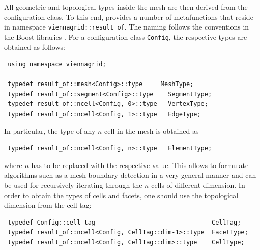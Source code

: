 All geometric and topological types inside the mesh are then derived from the configuration class. To this end, {\ViennaGrid} provides
a number of metafunctions that reside in namespace \lstinline|viennagrid::result_of|. The naming follows the conventions in the Boost libraries \cite{boost}.
For a configuration class \lstinline|Config|, the respective types are obtained as follows:
\begin{lstlisting}
 using namespace viennagrid;

 typedef result_of::mesh<Config>::type     MeshType;
 typedef result_of::segment<Config>::type    SegmentType;
 typedef result_of::ncell<Config, 0>::type   VertexType;
 typedef result_of::ncell<Config, 1>::type   EdgeType;
\end{lstlisting}
In particular, the type of any $n$-cell in the mesh is obtained as
\begin{lstlisting}
 typedef result_of::ncell<Config, n>::type   ElementType;
\end{lstlisting}
where $n$ has to be replaced with the respective value. This allows to formulate algorithms such as a mesh boundary detection in a very general manner and can be used for recursively iterating through the $n$-cells of different dimension. In order to obtain the types of cells and facets, one should use the topological dimension from the cell tag:
\begin{lstlisting}
 typedef Config::cell_tag                                CellTag;
 typedef result_of::ncell<Config, CellTag::dim-1>::type  FacetType;
 typedef result_of::ncell<Config, CellTag::dim>::type    CellType;
\end{lstlisting}


